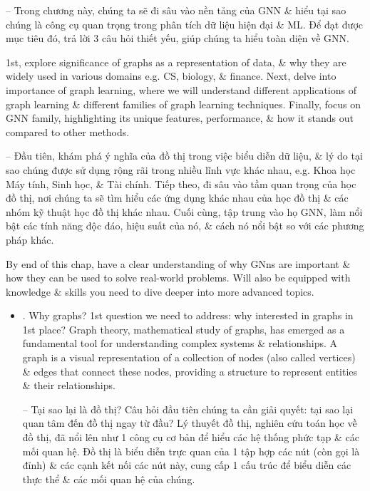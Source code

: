 \documentclass{article}
\begin{document}
\begin{itemize}
    -- Trong chương này, chúng ta sẽ đi sâu vào nền tảng của GNN \& hiểu tại sao chúng là công cụ quan trọng trong phân tích dữ liệu hiện đại \& ML. Để đạt được mục tiêu đó, trả lời 3 câu hỏi thiết yếu, giúp chúng ta hiểu toàn diện về GNN.

    1st, explore significance of graphs as a representation of data, \& why they are widely used in various domains e.g. CS, biology, \& finance. Next, delve into importance of graph learning, where we will understand different applications of graph learning \& different families of graph learning techniques. Finally, focus on GNN family, highlighting its unique features, performance, \& how it stands out compared to other methods.

    -- Đầu tiên, khám phá ý nghĩa của đồ thị trong việc biểu diễn dữ liệu, \& lý do tại sao chúng được sử dụng rộng rãi trong nhiều lĩnh vực khác nhau, e.g. Khoa học Máy tính, Sinh học, \& Tài chính. Tiếp theo, đi sâu vào tầm quan trọng của học đồ thị, nơi chúng ta sẽ tìm hiểu các ứng dụng khác nhau của học đồ thị \& các nhóm kỹ thuật học đồ thị khác nhau. Cuối cùng, tập trung vào họ GNN, làm nổi bật các tính năng độc đáo, hiệu suất của nó, \& cách nó nổi bật so với các phương pháp khác.

    By end of this chap, have a clear understanding of why GNns are important \& how they can be used to solve real-world problems. Will also be equipped with knowledge \& skills you need to dive deeper into more advanced topics.
    \begin{itemize}
        \item {. Why graphs?} 1st question we need to address: why interested in graphs in 1st place? Graph theory, mathematical study of graphs, has emerged as a fundamental tool for understanding complex systems \& relationships. A graph is a visual representation of a collection of nodes (also called vertices) \& edges that connect these nodes, providing a structure to represent entities \& their relationships.

        -- {\sf Tại sao lại là đồ thị?} Câu hỏi đầu tiên chúng ta cần giải quyết: tại sao lại quan tâm đến đồ thị ngay từ đầu? Lý thuyết đồ thị, nghiên cứu toán học về đồ thị, đã nổi lên như 1 công cụ cơ bản để hiểu các hệ thống phức tạp \& các mối quan hệ. Đồ thị là biểu diễn trực quan của 1 tập hợp các nút (còn gọi là đỉnh) \& các cạnh kết nối các nút này, cung cấp 1 cấu trúc để biểu diễn các thực thể \& các mối quan hệ của chúng.


\end{itemize}
\end{itemize}
\end{document}
